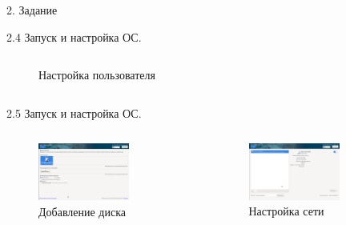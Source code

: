 \documentclass[
  ignorenonframetext,
  aspectratio=169,
]{beamer}
\begin{document}
\begin{frame}{2. Задание}
\begin{block}{2.4 Запуск и настройка ОС.}
\begin{columns}[c]
\begin{figure}
{}

\caption{Настройка пользователя}

\end{figure}%
\end{columns}
\end{block}

\begin{block}{2.5 Запуск и настройка ОС.}
\label{ux437ux430ux43fux443ux441ux43a-ux438-ux43dux430ux441ux442ux440ux43eux439ux43aux430-ux43eux441.-2}
\begin{columns}[c]
\begin{figure}

{\centering \includegraphics[width=0.7\textwidth,height=\textheight]{image/8.png}

}

\caption{Добавление диска}

\end{figure}%
\begin{figure}

{\centering \includegraphics[width=0.7\textwidth,height=\textheight]{image/9.png}

}

\caption{Настройка сети}

\end{figure}%
\end{columns}
\end{block}


\end{frame}
\end{document}
